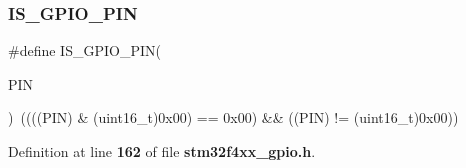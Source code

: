\subsubsection{I\+S\+\_\+\+G\+P\+I\+O\+\_\+\+P\+IN}
{\footnotesize\ttfamily \#define I\+S\+\_\+\+G\+P\+I\+O\+\_\+\+P\+IN(\begin{DoxyParamCaption}\item[{}]{P\+IN }\end{DoxyParamCaption})~((((P\+IN) \& (uint16\+\_\+t)0x00) == 0x00) \&\& ((\+P\+I\+N) != (uint16\+\_\+t)0x00))}



Definition at line \textbf{ 162} of file \textbf{ stm32f4xx\+\_\+gpio.\+h}.

